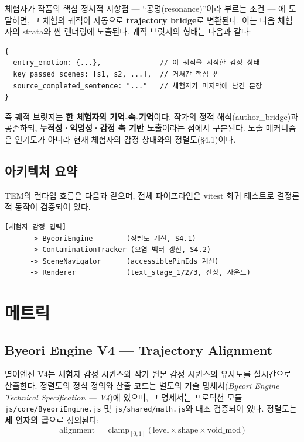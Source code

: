 \documentclass[11pt, a4paper]{article}
\begin{document}
체험자가 작품의 핵심 정서적 지향점 --- ``공명(resonance)''이라 부르는 조건 --- 에 도달하면, 그 체험의 궤적이 자동으로 \textbf{trajectory bridge}로 변환된다. 이는 다음 체험자의 strata와 씬 렌더링에 노출된다. 궤적 브릿지의 형태는 다음과 같다:

\begin{lstlisting}
{
  entry_emotion: {...},              // 이 궤적을 시작한 감정 상태
  key_passed_scenes: [s1, s2, ...],  // 거쳐간 핵심 씬
  source_completed_sentence: "..."   // 체험자가 마지막에 남긴 문장
}
\end{lstlisting}

즉 궤적 브릿지는 \textbf{한 체험자의 기억-속-기억}이다. 작가의 정적 해석(author\_bridge)과 공존하되, \textbf{누적성·익명성·감정 축 기반 노출}이라는 점에서 구분된다. 노출 메커니즘은 인기도가 아니라 현재 체험자의 감정 상태와의 정렬도(\S4.1)이다.

\subsection{아키텍처 요약}

TEM의 런타임 흐름은 다음과 같으며, 전체 파이프라인은 vitest 회귀 테스트로 결정론적 동작이 검증되어 있다.

\begin{lstlisting}
[체험자 감정 입력]
      -> ByeoriEngine        (정렬도 계산, S4.1)
      -> ContaminationTracker (오염 벡터 갱신, S4.2)
      -> SceneNavigator      (accessiblePinIds 계산)
      -> Renderer            (text_stage_1/2/3, 잔상, 사운드)
\end{lstlisting}

\section{메트릭}

\subsection{Byeori Engine V4 --- Trajectory Alignment}

별이엔진 V4는 체험자 감정 시퀀스와 작가 원본 감정 시퀀스의 유사도를 실시간으로 산출한다. 정렬도의 정식 정의와 산출 코드는 별도의 기술 명세서(\textit{Byeori Engine Technical Specification --- V4})에 있으며, 그 명세서는 프로덕션 모듈 \texttt{js/core/ByeoriEngine.js} 및 \texttt{js/shared/math.js}와 대조 검증되어 있다. 정렬도는 \textbf{세 인자의 곱}으로 정의된다:
\begin{equation}
\text{alignment} = \operatorname{clamp}_{[0,1]}\big(\, \text{level} \times \text{shape} \times \text{void\_mod} \,\big)
\end{equation}
\end{document}

